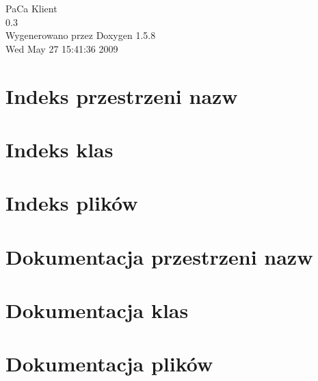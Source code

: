 \documentclass[a4paper]{book}
\begin{document}
\begin{titlepage}
\vspace*{7cm}
\begin{center}
{\Large PaCa Klient \\[1ex]\large 0.3 }\\
\vspace*{1cm}
{\large Wygenerowano przez Doxygen 1.5.8}\\
\vspace*{0.5cm}
{\small Wed May 27 15:41:36 2009}\\
\end{center}
\end{titlepage}
\clearemptydoublepage
{}
\tableofcontents
\clearemptydoublepage
{}
\chapter{Indeks przestrzeni nazw}

\chapter{Indeks klas}

\chapter{Indeks plików}

\chapter{Dokumentacja przestrzeni nazw}

\chapter{Dokumentacja klas}





\chapter{Dokumentacja plików}













\printindex
\end{document}

